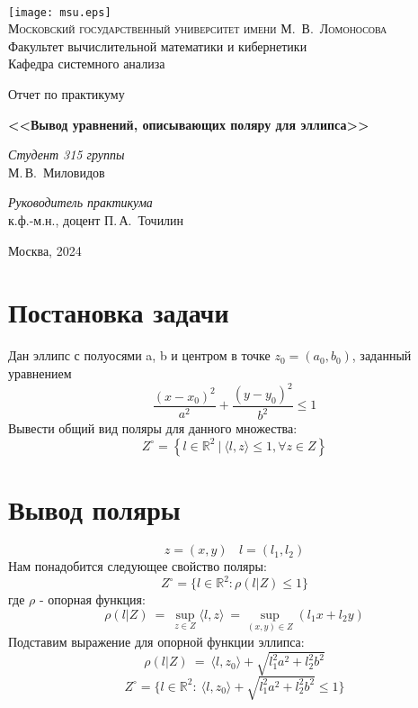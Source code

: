 \documentclass[11pt]{article}
\begin{document}
\thispagestyle{empty}

\begin{center}
\ \vspace{-3cm}

\texttt{[image: msu.eps]}\\
{\scshape Московский государственный университет имени М.~В.~Ломоносова}\\
Факультет вычислительной математики и кибернетики\\
Кафедра системного анализа

\vfill

{\LARGE Отчет по практикуму}

\vspace{1cm}

{\Huge\bfseries <<Вывод уравнений, описывающих поляру для эллипса>>}
\end{center}

\vspace{1cm}

\begin{flushright}
  \large
  \textit{Студент 315 группы}\\
  М.\,В.~Миловидов

  \vspace{5mm}

  \textit{Руководитель практикума}\\
  к.ф.-м.н., доцент П.\,А.~Точилин
\end{flushright}

\vfill

\begin{center}
Москва, 2024
\end{center}

\newpage
\section{Постановка задачи}

Дан эллипс с полуосями a, b и центром в точке $z_0 = (a_0, b_0)$, заданный уравнением
\[\frac{(x - x_0)^2}{a^2} + \frac{(y - y_0)^2}{b^2} \leq 1\]
\newline
Вывести общий вид поляры для данного множества:
\[Z^{\circ} = \left\{l \in \mathbb{R}^2~|~  \langle l, z \rangle \leq 1 , \forall z \in  Z\right\}\]

\section{Вывод поляры}
\[z = (x, y)~~~~ l = (l_1, l_2)\]
Нам понадобится следующее свойство поляры:
\[Z^{\circ} = \{l \in \mathbb{R}^2: \rho(l|Z) \leq 1\}\]
где $\rho$ - опорная функция:
\[\rho(l|Z)~=~\sup_{z\in Z} \langle l, z \rangle~= \sup_{(x, y)\in Z} (l_1 x + l_2 y)\]
\newline
Подставим выражение для опорной функции эллипса:
\[\rho(l|Z)~=~\langle l, z_0 \rangle + \sqrt{l_1^2 a^2 + l_2^2 b^2}\]
\[Z^{\circ} = \{l \in \mathbb{R}^2:~ \langle l, z_0 \rangle + \sqrt{l_1^2 a^2 + l_2^2 b^2} \leq 1\}\]
\end{document}
